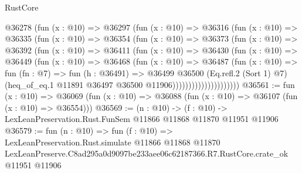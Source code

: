 \begin{lexlean}{RustCore}
\begin{coremodule}
                  @36278
                    (fun (x : @10) =>
                    @36297
                      (fun (x : @10) =>
                      @36316
                        (fun (x : @10) =>
                        @36335
                          (fun (x : @10) =>
                          @36354
                            (fun (x : @10) =>
                            @36373
                              (fun (x : @10) =>
                              @36392
                                (fun (x : @10) =>
                                @36411
                                  (fun (x : @10) =>
                                  @36430
                                    (fun (x : @10) =>
                                    @36449
                                      (fun (x : @10) =>
                                      @36468
                                        (fun (x : @10) =>
                                        @36487
                                          (fun (x : @10) =>
                                          fun (fn : @7) =>
                                          fun (h : @36491) =>
                                          @36499
                                            @36500
                                            (Eq.refl.{2} (Sort 1) @7)
                                            (heq_of_eq.{1}
                                              @11891
                                              @36497
                                              @36500
                                              @11906)))))))))))))))))))))
@36561 := fun (x : @10) =>
  @36069 (fun (x : @10) => @36088 (fun (x : @10) => @36107 (fun (x : @10) => @36554)))
@36569 := (n : @10) ->
  (f : @10) -> LexLeanPreservation.Rust.FunSem @11866 @11868 @11870 @11951 @11906
@36579 := fun (n : @10) =>
  fun (f : @10) =>
  LexLeanPreservation.Rust.simulate
    @11866
    @11868
    @11870
    LexLeanPreserve.C8ad295a0d9097be233aee06c62187366.R7.RustCore.crate_ok
    @11951
    @11906
\end{coremodule}
\end{lexlean}
